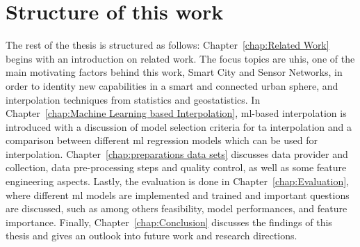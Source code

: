 \section{Structure of this work}

The rest of the thesis is structured as follows: Chapter~\ref{chap:Related Work} begins with an introduction on related work. The focus topics are \gls{uhi}s, one of the main motivating factors behind this work, Smart City and Sensor Networks, in order to identity new capabilities in a smart and connected urban sphere, and interpolation techniques from statistics and geostatistics. In Chapter~\ref{chap:Machine Learning based Interpolation}, \gls{ml}-based interpolation is introduced with a discussion of model selection criteria for \gls{ta} interpolation and a comparison between different \gls{ml} regression models which can be used for interpolation. Chapter~\ref{chap:preparations data sets} discusses data provider and collection, data pre-processing steps and quality control, as well as some feature engineering aspects. Lastly, the evaluation is done in Chapter~\ref{chap:Evaluation}, where different \gls{ml} models are implemented and trained and important questions are discussed, such as among others feasibility, model performances, and feature importance. Finally, Chapter~\ref{chap:Conclusion} discusses the findings of this thesis and gives an outlook into future work and research directions.
